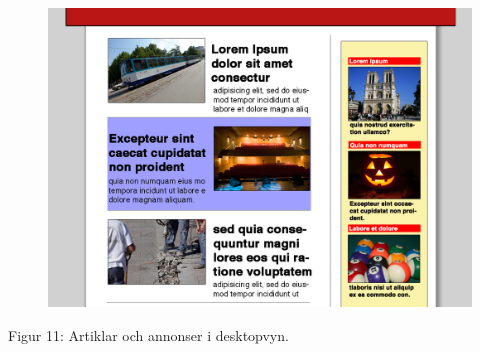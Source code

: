 \documentclass[11pt]{article}
\begin{document}
\begin{figure}[H]
\centerline{%
\includegraphics[scale=0.3]{pics/artikelannonsdesktop.png}
}
\end{figure}
\hspace{0.5cm}Figur 11: Artiklar och annonser i desktopvyn.
\\
\end{document}
